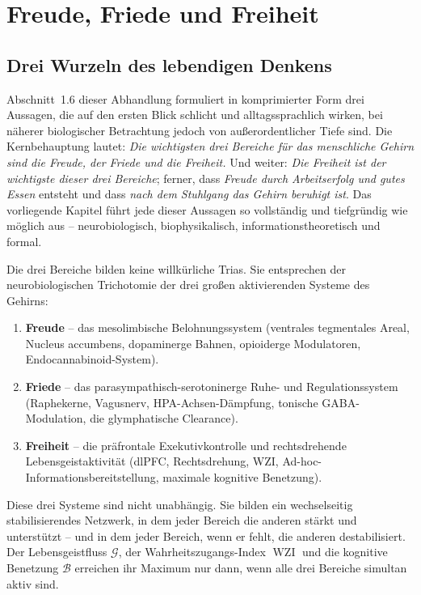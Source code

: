 ﻿\documentclass[12pt,a4paper]{report}
\theoremstyle{plain}
\theoremstyle{definition}
\theoremstyle{remark}
\DeclareMathOperator{\WZI}{WZI}
\begin{document}
	\chapter{Freude, Friede und Freiheit}

	\section{Drei Wurzeln des lebendigen Denkens}

	Abschnitt~1.6 dieser Abhandlung formuliert in komprimierter Form drei Aussagen,
	die auf den ersten Blick schlicht und alltagssprachlich wirken,
	bei näherer biologischer Betrachtung jedoch von außerordentlicher Tiefe sind.
	Die Kernbehauptung lautet: \emph{Die wichtigsten drei Bereiche für das
	menschliche Gehirn sind die Freude, der Friede und die Freiheit.}
	Und weiter: \emph{Die Freiheit ist der wichtigste dieser drei Bereiche};
	ferner, dass \emph{Freude durch Arbeitserfolg und gutes Essen} entsteht
	und dass \emph{nach dem Stuhlgang das Gehirn beruhigt ist}.
	Das vorliegende Kapitel führt jede dieser Aussagen so vollständig und
	tiefgründig wie möglich aus -- neurobiologisch, biophysikalisch,
	informationstheoretisch und formal.

	Die drei Bereiche bilden keine willkürliche Trias.
	Sie entsprechen der neurobiologischen Trichotomie der drei großen
	aktivierenden Systeme des Gehirns:
	\begin{enumerate}[label=(\roman*), leftmargin=1.8cm]
		\item \textbf{Freude} -- das mesolimbische Belohnungssystem
		(ventrales tegmentales Areal, Nucleus accumbens, dopaminerge Bahnen,
		opioiderge Modulatoren, Endocanna\-binoid-System).
		\item \textbf{Friede} -- das parasympathisch-serotoninerge Ruhe-
		und Regulationssystem (Raphekerne, Vagusnerv, HPA-Achsen-Dämpfung,
		tonische GABA-Modulation, die glymphatische Clearance).
		\item \textbf{Freiheit} -- die präfrontale Exekutivkontrolle und
		rechtsdrehende Lebensgeistaktivität (dlPFC, Rechtsdrehung, WZI,
		Ad-hoc-Informationsbereitstellung, maximale kognitive Benetzung).
	\end{enumerate}

	Diese drei Systeme sind nicht unabhängig.
	Sie bilden ein wechselseitig stabilisierendes Netzwerk,
	in dem jeder Bereich die anderen stärkt und unterstützt --
	und in dem jeder Bereich, wenn er fehlt, die anderen destabilisiert.
	Der Lebensgeistfluss $\mathcal{G}$, der Wahrheitszu\-gangs-Index $\WZI$
	und die kognitive Benetzung $\mathcal{B}$ erreichen ihr Maximum
	nur dann, wenn alle drei Bereiche simultan aktiv sind.
\end{document}
